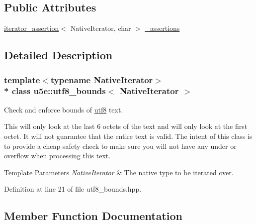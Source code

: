 \subsection*{Public Attributes}
\begin{DoxyCompactItemize}
\item 
\hyperlink{classu5e_1_1iterator__assertion}{iterator\+\_\+assertion}$<$ Native\+Iterator, char $>$ \hyperlink{classu5e_1_1utf8__bounds_a7469c5f9eaf73b8852039329279e3c0e}{\+\_\+assertions}
\end{DoxyCompactItemize}


\subsection{Detailed Description}
\subsubsection*{template$<$typename Native\+Iterator$>$\\*
class u5e\+::utf8\+\_\+bounds$<$ Native\+Iterator $>$}

Check and enforce bounds of \hyperlink{classu5e_1_1utf8}{utf8} text. 

This will only look at the last 6 octets of the text and will only look at the first octet. It will not guarantee that the entire text is valid. The intent of this class is to provide a cheap safety check to make sure you will not have any under or overflow when processing this text.


\begin{DoxyTemplParams}{Template Parameters}
{\em Native\+Iterator} & The native type to be iterated over. \\
\hline
\end{DoxyTemplParams}


Definition at line 21 of file utf8\+\_\+bounds.\+hpp.



\subsection{Member Function Documentation}
